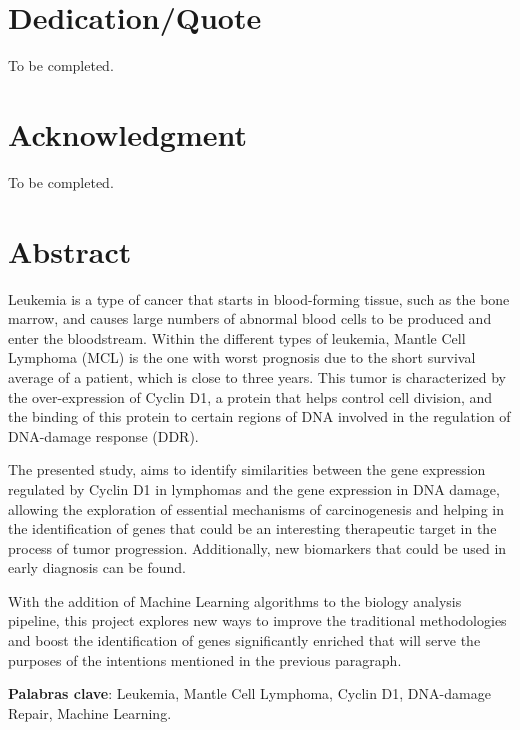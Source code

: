 \chapter*{Dedication/Quote}

To be completed.

\chapter*{Acknowledgment}

To be completed.

\chapter*{Abstract}

\onehalfspacing

Leukemia is a type of cancer that starts in blood-forming tissue, such as the bone marrow, and causes large numbers of abnormal blood cells to be produced and enter the bloodstream.
Within the different types of leukemia, Mantle Cell Lymphoma (MCL) is the one with worst prognosis due to the short survival average of a patient, which is close to three years.
This tumor is characterized by the over-expression of Cyclin D1, a protein that helps control cell division, and the binding of this protein to certain regions of DNA involved in the regulation of DNA-damage response (DDR).


The presented study, aims to identify similarities between the gene expression regulated by Cyclin D1 in lymphomas and the gene expression in DNA damage, allowing the exploration of essential mechanisms of carcinogenesis and helping in the identification of genes that could be an interesting therapeutic target in the process of tumor progression. Additionally, new biomarkers that could be used in early diagnosis can be found.

With the addition of Machine Learning algorithms to the biology analysis pipeline, this project explores new ways to improve the traditional methodologies and boost the identification of genes significantly enriched that will serve the purposes of the intentions mentioned in the previous paragraph.



\vspace{1.5cm}

\textbf{Palabras clave}: Leukemia, Mantle Cell Lymphoma, Cyclin D1, DNA-damage Repair, Machine Learning.